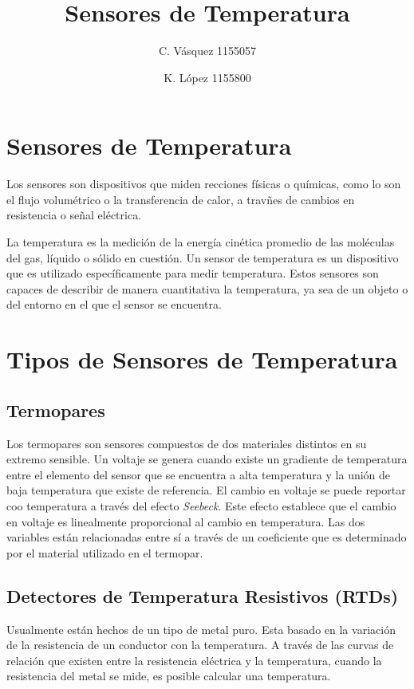 \documentclass[12pt, letterpaper]{article}
\title{Sensores de Temperatura}
\author{C. Vásquez 1155057 \and K. López 1155800}
\begin{document}
\maketitle

\section{Sensores de Temperatura}

Los sensores son dispositivos que miden recciones físicas o químicas, como lo son el flujo volumétrico o la transferencia de calor, a travñes de cambios en resistencia o señal eléctrica. 

La temperatura es la medición de la energía cinética promedio de las moléculas del gas, líquido o sólido en cuestión. Un sensor de temperatura es un dispositivo que es utilizado específicamente para medir temperatura. Estos sensores son capaces de describir de manera cuantitativa la temperatura, ya sea de un objeto o del entorno en el que el sensor se encuentra.

\section{Tipos de Sensores de Temperatura}
\subsection{Termopares}
Los termopares son sensores compuestos de dos materiales distintos en su extremo
sensible. Un voltaje se genera cuando existe un gradiente de temperatura entre el
elemento del sensor que se encuentra a alta temperatura y la unión de baja temperatura que existe de referencia. El cambio en voltaje se puede reportar coo temperatura a través del efecto \textit{Seebeck}. Este efecto establece que el cambio en voltaje es linealmente proporcional al cambio en temperatura. Las dos variables están relacionadas entre sí a través de un coeficiente que es determinado por el material utilizado en el termopar.

\subsection{Detectores de Temperatura Resistivos (RTDs)}

Usualmente están hechos de un tipo de metal puro. Esta basado en la variación de la resistencia de un conductor con la temperatura. A través de las curvas de relación que existen entre la resistencia eléctrica y la temperatura, cuando la resistencia del metal se mide, es posible calcular una temperatura.
\end{document}

